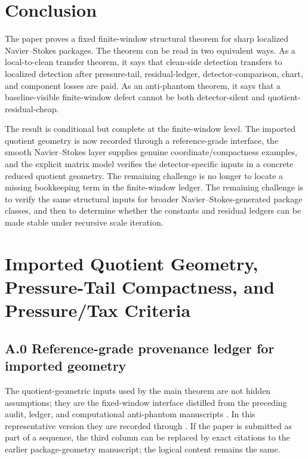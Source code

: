 \documentclass[11pt]{article}
\numberwithin{equation}{section}
\theoremstyle{definition}
\theoremstyle{remark}
\begin{document}
\section{Conclusion}\label{sec:final-conclusion}

The paper proves a fixed finite-window structural theorem for sharp localized Navier--Stokes packages.  The theorem can be read in two equivalent ways.  As a local-to-clean transfer theorem, it says that clean-side detection transfers to localized detection after pressure-tail, residual-ledger, detector-comparison, chart, and component losses are paid.  As an anti-phantom theorem, it says that a baseline-visible finite-window defect cannot be both detector-silent and quotient-residual-cheap.

The result is conditional but complete at the finite-window level.  The imported quotient geometry is now recorded through a reference-grade interface, the smooth Navier--Stokes layer supplies genuine coordinate/compactness examples, and the explicit matrix model verifies the detector-specific inputs in a concrete reduced quotient geometry.  The remaining challenge is no longer to locate a missing bookkeeping term in the finite-window ledger.  The remaining challenge is to verify the same structural inputs for broader Navier--Stokes-generated package classes, and then to determine whether the constants and residual ledgers can be made stable under recursive scale iteration.

\appendix


\section{Imported Quotient Geometry, Pressure-Tail Compactness, and Pressure/Tax Criteria}\label{app:pressure-tail-details}\label{app:imported-geometry-module}

\subsection*{A.0 Reference-grade provenance ledger for imported geometry}

The quotient-geometric inputs used by the main theorem are not hidden assumptions; they are the fixed-window interface distilled from the preceding audit, ledger, and computational anti-phantom manuscripts \cite{YuInvisible2026,YuCriticalLedgers2026,YuSingularityAuditTransfer2026,YuComputationalAntiPhantom2026}.  In this representative version they are recorded through .  If the paper is submitted as part of a sequence, the third column can be replaced by exact citations to the earlier package-geometry manuscript; the logical content remains the same.
\end{document}
